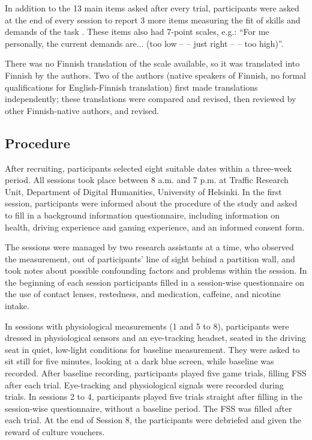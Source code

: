 \documentclass{frontierstyle/frontiersSCNS}
\newcommand{\hl}{\textcolor{red!80}}
\begin{document}
In addition to the 13 main items asked after every trial, participants were asked at the end of every session to report 3 more items measuring the fit of skills and demands of the task  \citep{Rheinberg2003}. These items also had 7-point scales, e.g.: ``For me personally, the current demands are... (too low -- -- just right -- -- too high)''.

There was no Finnish translation of the scale available, so it was translated into Finnish by the authors. Two of the authors (native speakers of Finnish, no formal qualifications for English-Finnish translation) first made translations independently; these translations were compared and revised, then reviewed by other Finnish-native authors, and revised.

\subsection{Procedure}
After recruiting, participants selected eight suitable dates within a three-week period. All sessions took place between 8 a.m. and 7 p.m. at Traffic Research Unit, Department of Digital Humanities, University of Helsinki. In the first session, participants were informed about the procedure of the study and asked to fill in a background information questionnaire, including information on health, driving experience and gaming experience, and an informed consent form.

The sessions were managed by two research assistants at a time, who observed the measurement, out of participants' line of sight behind a partition wall, and took notes about possible confounding factors and problems within the session. In the beginning of each session participants filled in a session-wise questionnaire on the use of contact lenses, restedness, and medication, caffeine, and nicotine intake.

In sessions with physiological measurements (1 and 5 to 8), participants were dressed in physiological sensors and an eye-tracking headset, seated in the driving seat in quiet, low-light conditions for baseline measurement. They were asked to sit still for five minutes, looking at a dark blue screen, while baseline was recorded. After baseline recording, participants played five game trials, filling FSS after each trial. \hl{Eye-tracking and physiological signals were recorded during trials.} In sessions 2 to 4, participants played five trials straight after filling in the session-wise questionnaire, without a baseline period. The FSS was filled after each trial. At the end of Session 8, the participants were debriefed and given the reward of culture vouchers.
\end{document}
